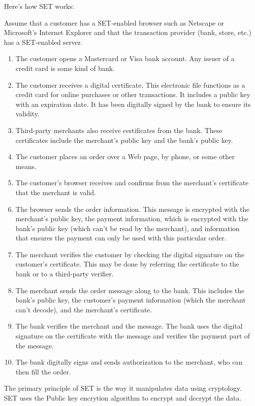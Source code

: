 \documentclass[11pt,a4paper,twoside,notitlepage]{article}
\begin{document}
Here's how SET works: 

Assume that a customer has a SET-enabled browser such as Netscape or Microsoft's Internet Explorer and that the transaction provider (bank,
store, etc.) has a SET-enabled server. 
\begin{enumerate}
\item    	The customer opens a Mastercard or Visa bank account. Any issuer of a credit card is some kind of bank. 
\item     The customer receives a digital certificate. This electronic file functions as a credit card for online purchases or other transactions. It includes a public key with
       an expiration date. It has been digitally signed by the bank to ensure its validity. 
\item     Third-party merchants also receive certificates from the bank. These certificates include the merchant's public key and the bank's public key. 
\item     The customer places an order over a Web page, by phone, or some other means. 
\item    The customer's browser receives and confirms from the merchant's certificate that the merchant is valid. 
\item    The browser sends the order information. This message is encrypted with the merchant's public key, the payment information, which is encrypted with the
       bank's public key (which can't be read by the merchant), and information that ensures the payment can only be used with this particular order. 
\item    The merchant verifies the customer by checking the digital signature on the customer's certificate. This may be done by referring the certificate to the bank
       or to a third-party verifier. 
\item    The merchant sends the order message along to the bank. This includes the bank's public key, the customer's payment information (which the merchant can't
       decode), and the merchant's certificate. 
\item    The bank verifies the merchant and the message. The bank uses the digital signature on the certificate with the message and verifies the payment part of the
       message. 
\item   The bank digitally signs and sends authorization to the merchant, who can then fill the order. 
\end{enumerate}

The primary principle of SET is the way it manipulates data using cryptology.
SET uses the Public key encrytion algorithm to encrypt and decrypt the data. 
\end{document}
